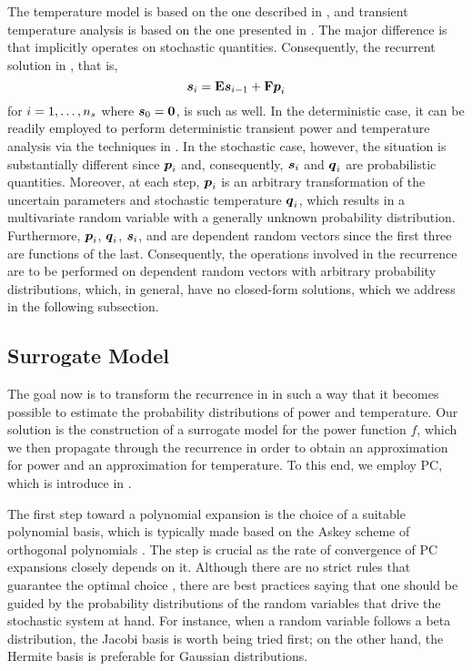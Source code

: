 The temperature model is based on the one described in ,
and transient temperature analysis is based on the one presented in
. The major difference is that
 implicitly operates on stochastic quantities.
Consequently, the recurrent solution in , that
is,
\begin{equation} \elab{analog-recurrence-original}
  \vs_i = \m{E} \vs_{i - 1} + \m{F} \vp_i
\end{equation}
for $i = 1, \dots, {n_{s}}$ where $\boldsymbol{s}_0 = \boldsymbol{0}$, is such as well. In the
deterministic case, it can be readily employed to perform deterministic
transient power and temperature analysis via the techniques in
. In the stochastic case, however, the
situation is substantially different since $\boldsymbol{p}_i$ and, consequently, $\boldsymbol{s}_i$
and $\boldsymbol{q}_i$ are probabilistic quantities. Moreover, at each step, $\boldsymbol{p}_i$ is an
arbitrary transformation of the uncertain parameters \vu and stochastic
temperature $\boldsymbol{q}_i$, which results in a multivariate random variable with a
generally unknown probability distribution. Furthermore, $\boldsymbol{p}_i$, $\boldsymbol{q}_i$,
$\boldsymbol{s}_i$, and \vu are dependent random vectors since the first three are
functions of the last. Consequently, the operations involved in the recurrence
are to be performed on dependent random vectors with arbitrary probability
distributions, which, in general, have no closed-form solutions, which we
address in the following subsection.

\subsection{Surrogate Model}

The goal now is to transform the recurrence in 
in such a way that it becomes possible to estimate the probability distributions
of power and temperature. Our solution is the construction of a surrogate model
for the power function $f$, which we then propagate through the recurrence in
order to obtain an approximation for power and an approximation for temperature.
To this end, we employ \ac{PC}, which is introduce in .

The first step toward a polynomial expansion is the choice of a suitable
polynomial basis, which is typically made based on the Askey scheme of
orthogonal polynomials \cite{xiu2010}. The step is crucial as the rate of
convergence of \ac{PC} expansions closely depends on it. Although there are no
strict rules that guarantee the optimal choice \cite{knio2006}, there are best
practices saying that one should be guided by the probability distributions of
the random variables that drive the stochastic system at hand. For instance,
when a random variable follows a beta distribution, the Jacobi basis is worth
being tried first; on the other hand, the Hermite basis is preferable for
Gaussian distributions.

